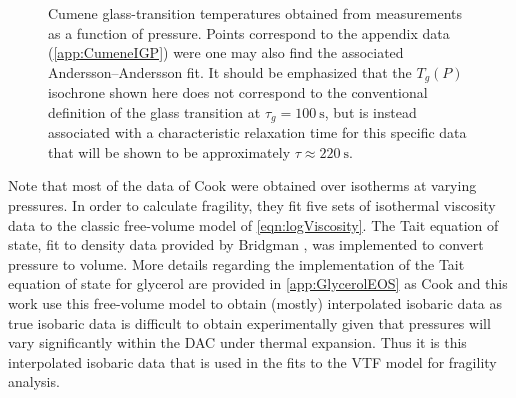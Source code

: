 	\begin{figure}[!htbp]
		\centering
		\caption{Cumene glass-transition temperatures obtained from \tgp measurements as a function of pressure. Points correspond to the appendix data (\app\ref{app:CumeneIGP}) were one may also find the associated Andersson--Andersson fit. It should be emphasized that the $T_g(P)$ isochrone shown here does not correspond to the conventional definition of the glass transition at $\tau_g = 100~\si{\second}$, but is instead associated with a characteristic relaxation time for this specific \tgp data that will be shown to be approximately $\tau \approx 220~\si{\second}$.}
		\label{fig:CumeneIGPAA}
	\end{figure} 
	
	Note that most of the data of Cook \etal were obtained over isotherms at varying pressures.  In order to calculate fragility, they fit five sets of isothermal viscosity data to the classic free-volume model of \eqn\nolinebreak \ref{eqn:logViscosity}.  The Tait equation of state, fit to density data provided by Bridgman \nolinebreak\cite{BridgmanGly}, was implemented to convert pressure to volume.  More details regarding the implementation of the Tait equation of state for glycerol are provided in \app\nolinebreak \ref{app:GlycerolEOS} as Cook \etal and this work use this free-volume model to obtain (mostly) interpolated isobaric data as true isobaric data is difficult to obtain experimentally given that pressures will vary significantly within the DAC under thermal expansion.  Thus it is this interpolated isobaric data that is used in the fits to the VTF model for fragility analysis. 
	
